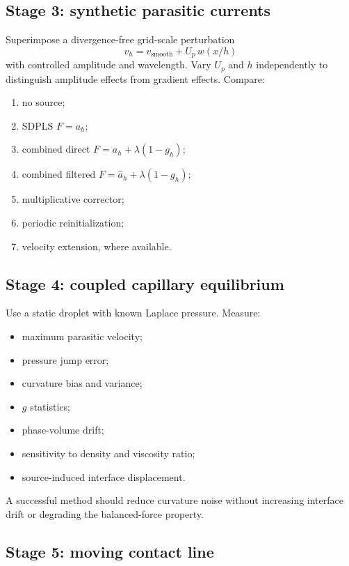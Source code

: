 \documentclass[11pt,a4paper]{article}
\theoremstyle{definition}
\theoremstyle{remark}
\begin{document}
\subsection{Stage 3: synthetic parasitic currents}

Superimpose a divergence-free grid-scale perturbation
\begin{equation}
  v_h=v_{\mathrm{smooth}}+U_p\,w(x/h)
\end{equation}
with controlled amplitude and wavelength. Vary $U_p$ and $h$ independently to distinguish amplitude effects from gradient effects. Compare:
\begin{enumerate}
  \item no source;
  \item SDPLS $F=a_h$;
  \item combined direct $F=a_h+\lambda(1-g_h)$;
  \item combined filtered $F=\widehat a_h+\lambda(1-g_h)$;
  \item multiplicative corrector;
  \item periodic reinitialization;
  \item velocity extension, where available.
\end{enumerate}

\subsection{Stage 4: coupled capillary equilibrium}

Use a static droplet with known Laplace pressure. Measure:
\begin{itemize}
  \item maximum parasitic velocity;
  \item pressure jump error;
  \item curvature bias and variance;
  \item $g$ statistics;
  \item phase-volume drift;
  \item sensitivity to density and viscosity ratio;
  \item source-induced interface displacement.
\end{itemize}
A successful method should reduce curvature noise without increasing interface drift or degrading the balanced-force property.

\subsection{Stage 5: moving contact line}
\end{document}
